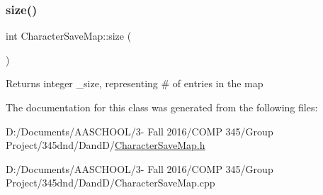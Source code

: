 \subsubsection{\texorpdfstring{size()}{size()}}
{\footnotesize\ttfamily int Character\+Save\+Map\+::size (\begin{DoxyParamCaption}{ }\end{DoxyParamCaption})}

\begin{DoxyReturn}{Returns}
integer \+\_\+size, representing \# of entries in the map 
\end{DoxyReturn}


The documentation for this class was generated from the following files\+:\begin{DoxyCompactItemize}
\item 
D\+:/\+Documents/\+A\+A\+S\+C\+H\+O\+O\+L/3-\/ Fall 2016/\+C\+O\+M\+P 345/\+Group Project/345dnd/\+Dand\+D/\hyperlink{_character_save_map_8h}{Character\+Save\+Map.\+h}\item 
D\+:/\+Documents/\+A\+A\+S\+C\+H\+O\+O\+L/3-\/ Fall 2016/\+C\+O\+M\+P 345/\+Group Project/345dnd/\+Dand\+D/Character\+Save\+Map.\+cpp\end{DoxyCompactItemize}
